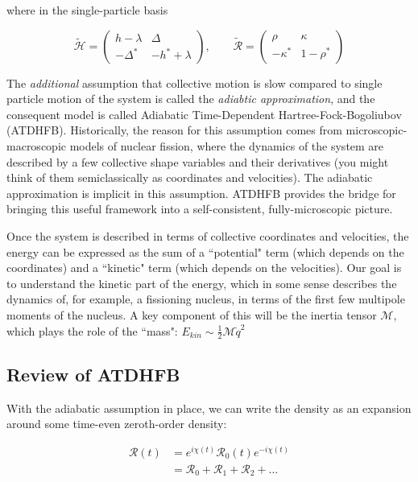 \noindent where in the single-particle basis

\begin{equation*}
\mathcal{\tilde{H}} = 
\left(\begin{array}{cc}
h-\lambda & \Delta \\
-\Delta^* & -h^*+\lambda
\end{array}\right), 
\qquad \mathcal{\tilde{R}} = 
\left(\begin{array}{cc}
\rho & \kappa \\
-\kappa^* & 1-\rho^*
\end{array}\right)
\end{equation*}

The \textit{additional} assumption that collective motion is slow compared to single particle motion of the system is called the \textit{adiabtic approximation}, and the consequent model is called Adiabatic Time-Dependent Hartree-Fock-Bogoliubov (ATDHFB). Historically, the reason for this assumption comes from microscopic-macroscopic models of nuclear fission, where the dynamics of the system are described by a few collective shape variables and their derivatives (you might think of them semiclassically as coordinates and velocities). The adiabatic approximation is implicit in this assumption. ATDHFB provides the bridge for bringing this useful framework into a self-consistent, fully-microscopic picture.

Once the system is described in terms of collective coordinates and velocities, the energy can be expressed as the sum of a ``potential" term (which depends on the coordinates) and a ``kinetic" term (which depends on the velocities). Our goal is to understand the kinetic part of the energy, which in some sense describes the dynamics of, for example, a fissioning nucleus, in terms of the first few multipole moments of the nucleus. A key component of this will be the inertia tensor $\mathcal{M}$, which plays the role of the ``mass": $E_{kin}\sim\frac{1}{2}\mathcal{M}\dot{q}^2$

\subsection{Review of ATDHFB}

With the adiabatic assumption in place, we can write the density as an expansion around some time-even zeroth-order density:

\begin{align*}
\mathcal{R}(t) 
&= e^{i\chi(t)}\mathcal{R}_0(t)e^{-i\chi(t)} \\
&= \mathcal{R}_0 + \mathcal{R}_1 + \mathcal{R}_2 + \dots
\end{align*}

